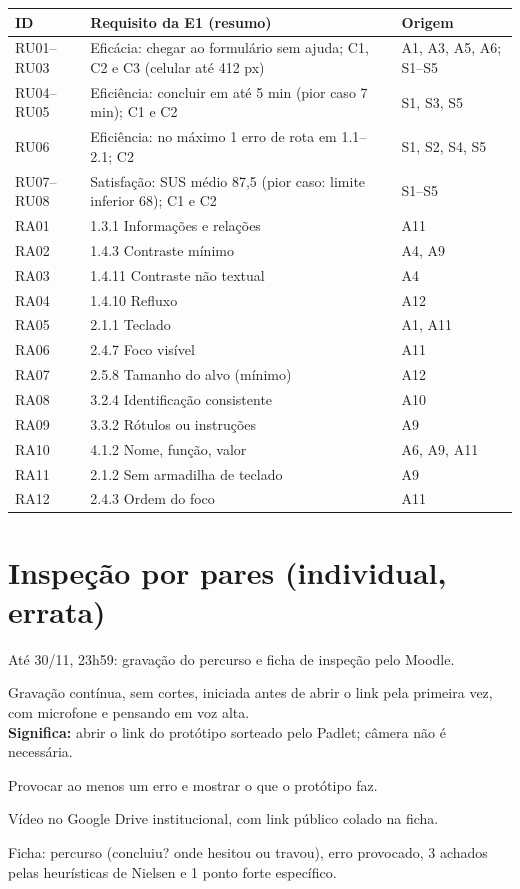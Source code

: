 \documentclass[11pt,a4paper]{article}
\newcommand{\obs}[1]{\\{\small\color{cinza}\textbf{Significa:} #1}}
\begin{document}
\begin{center}\footnotesize
\begin{tabularx}{\textwidth}{|l|Y|l|}\hline
  ID & Requisito da E1 (resumo) & Origem \\\hline
  RU01--RU03 & Eficácia: chegar ao formulário sem ajuda; C1, C2 e C3 (celular até 412 px) & A1, A3, A5, A6; S1--S5 \\\hline
  RU04--RU05 & Eficiência: concluir em até 5 min (pior caso 7 min); C1 e C2 & S1, S3, S5 \\\hline
  RU06 & Eficiência: no máximo 1 erro de rota em 1.1--2.1; C2 & S1, S2, S4, S5 \\\hline
  RU07--RU08 & Satisfação: SUS médio 87,5 (pior caso: limite inferior 68); C1 e C2 & S1--S5 \\\hline
  RA01 & 1.3.1 Informações e relações & A11 \\\hline
  RA02 & 1.4.3 Contraste mínimo & A4, A9 \\\hline
  RA03 & 1.4.11 Contraste não textual & A4 \\\hline
  RA04 & 1.4.10 Refluxo & A12 \\\hline
  RA05 & 2.1.1 Teclado & A1, A11 \\\hline
  RA06 & 2.4.7 Foco visível & A11 \\\hline
  RA07 & 2.5.8 Tamanho do alvo (mínimo) & A12 \\\hline
  RA08 & 3.2.4 Identificação consistente & A10 \\\hline
  RA09 & 3.3.2 Rótulos ou instruções & A9 \\\hline
  RA10 & 4.1.2 Nome, função, valor & A6, A9, A11 \\\hline
  RA11 & 2.1.2 Sem armadilha de teclado & A9 \\\hline
  RA12 & 2.4.3 Ordem do foco & A11 \\\hline
\end{tabularx}
\end{center}

\section{Inspeção por pares (individual, errata)}

\begin{checks}
  \item Até 30/11, 23h59: gravação do percurso e ficha de inspeção pelo Moodle.
  \item Gravação contínua, sem cortes, iniciada antes de abrir o link pela primeira vez, com microfone e pensando em voz alta.
    \obs{abrir o link do protótipo sorteado pelo Padlet; câmera não é necessária.}
  \item Provocar ao menos um erro e mostrar o que o protótipo faz.
  \item Vídeo no Google Drive institucional, com link público colado na ficha.
  \item Ficha: percurso (concluiu? onde hesitou ou travou), erro provocado, 3 achados pelas heurísticas de Nielsen e 1 ponto forte específico.
\end{checks}
\end{document}

